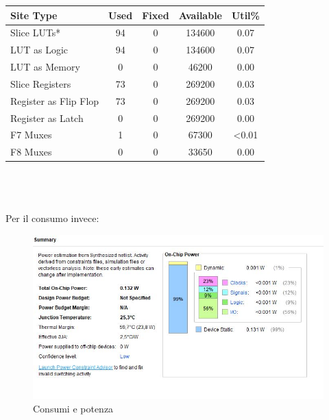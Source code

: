 \documentclass[12pt]{article} %
\begin{document}
			\begin{tabular}{lcccc}
				\toprule
				Site Type                   & Used & Fixed & Available & Util\% \\
				\midrule
				Slice LUTs*                 & 94   & 0     & 134600    & 0.07   \\
				\quad LUT as Logic          & 94   & 0     & 134600    & 0.07   \\
				\quad LUT as Memory         & 0    & 0     & 46200     & 0.00   \\
				Slice Registers             & 73   & 0     & 269200    & 0.03  \\
				\quad Register as Flip Flop & 73    & 0     & 269200    & 0.03  \\
				\quad Register as Latch     & 0   & 0     & 269200    & 0.00  \\
				F7 Muxes                    & 1    & 0     & 67300     & <0.01   \\
				F8 Muxes                    & 0    & 0     & 33650     & 0.00   \\
				\bottomrule
		\end{tabular} \\ \\ \\
		
		Per il consumo invece: 
		
		\begin{figure}[H]
			\centering
			\includegraphics[width=\textwidth]{Report_Power.jpg}
			\caption{Consumi e potenza}
			\label{fig:Report_Power}
		\end{figure}
		\newpage
\end{document}

